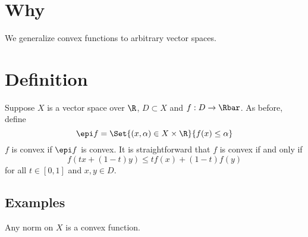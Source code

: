 
\section*{Why}

We generalize convex functions to arbitrary vector spaces.

\section*{Definition}

Suppose $X$ is a vector space over $\R $, $D \subset X$ and $f: D \to \Rbar$.
As before, define
\[
\epi f = \Set{(x, \alpha ) \in X \times  \R }{f(x) \leq \alpha }
\]
$f$ is convex if $\epi f$ is convex.
It is straightforward that $f$ is convex if and only if
\[
f(tx + (1-t)y) \leq tf(x) + (1-t)f(y)
\]
for all $t \in [0,1]$ and $x,y \in D$.

\subsection*{Examples}

Any norm on $X$ is a convex function.

\blankpage